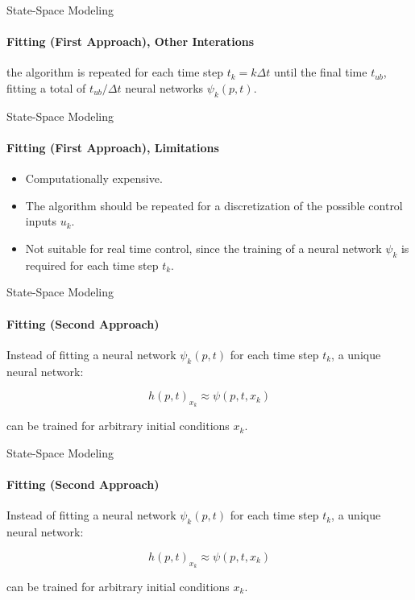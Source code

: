 \begin{frame}{State-Space Modeling}
\framesubtitle{Fitting (First Approach), Other Interations}

the algorithm is repeated for each time step $t_k = k \Delta t$ until the final time $t_{ub}$, fitting a total of $t_{ub}/\Delta t$ neural networks $\psi_k(p, t)$.

\end{frame}

\begin{frame}{State-Space Modeling}
\framesubtitle{Fitting (First Approach), Limitations}

\begin{itemize}
    \item Computationally expensive.
    \item The algorithm should be repeated for a discretization of the possible control inputs $u_k$.
    \item Not suitable for real time control, since the training of a neural network $\psi_k$ is required for each time step $t_k$.
\end{itemize}

\end{frame}

\begin{frame}{State-Space Modeling}
\framesubtitle{Fitting (Second Approach)}

Instead of fitting a neural network $\psi_k(p, t)$ for each time step $t_k$, a unique neural network:

\begin{equation}
h(p, t)_{x_k} \approx \psi(p, t, x_k)
\end{equation}

can be trained for arbitrary initial conditions $x_k$.

\end{frame}

\begin{frame}{State-Space Modeling}
\framesubtitle{Fitting (Second Approach)}

Instead of fitting a neural network $\psi_k(p, t)$ for each time step $t_k$, a unique neural network:

\begin{equation}
h(p, t)_{x_k} \approx \psi(p, t, x_k)
\end{equation}

can be trained for arbitrary initial conditions $x_k$.

\end{frame}

